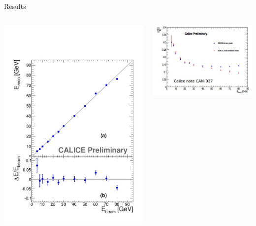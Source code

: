 \documentclass[10pt]{beamer}
\begin{document}
\begin{frame}{Results}
\begin{columns}
\begin{column}{0.5\textwidth}

  \centerline{\includegraphics[height=0.9\textheight]{jpg/Energy-Linearity.jpg}}
\end{column}
\begin{column}{0.5\textwidth}

  \centerline{\includegraphics[width=1.15\textwidth]{jpg/Beam2012Resolution.jpg}}

\end{column}
\end{columns}
\end{frame}
\end{document}
